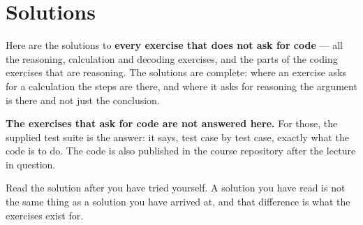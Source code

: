 \chapter{Solutions}
\label{ch:losningar}

Here are the solutions to \textbf{every exercise that does not ask for code} --- all the
reasoning, calculation and decoding exercises, and the parts of the coding exercises that are
reasoning. The solutions are complete: where an exercise asks for a calculation the steps are
there, and where it asks for reasoning the argument is there and not just the conclusion.

\textbf{The exercises that ask for code are not answered here.} For those, the supplied test suite
is the answer: it says, test case by test case, exactly what the code is to do. The code is also
published in the course repository after the lecture in question.

Read the solution after you have tried yourself. A solution you have read is not the same thing as
a solution you have arrived at, and that difference is what the exercises exist for.















